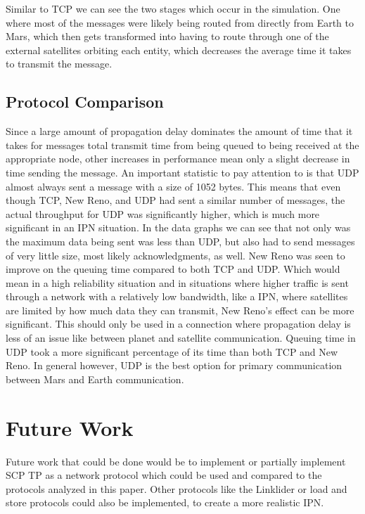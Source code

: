 \documentclass[a4paper,12pt]{article}
\begin{document}
Similar to TCP we can see the two stages which occur in the simulation. One
where most of the messages were likely being routed from directly from Earth to
Mars, which then gets transformed into having to route through one of the
external satellites orbiting each entity, which decreases the average time it
takes to transmit the message.

\subsection{Protocol Comparison}

Since a large amount of propagation delay dominates the amount of time that it
takes for messages total transmit time from being queued to being received at
the appropriate node, other increases in performance mean only a slight decrease
in time sending the message. An important statistic to pay attention to is that
UDP almost always sent a message with a size of 1052 bytes. This means that even
though TCP, New Reno, and UDP had sent a similar number of messages, the actual
throughput for UDP was significantly higher, which is much more significant in
an IPN situation. In the data graphs we can see that not only was the maximum
data being sent was less than UDP, but also had to send messages of very little
size, most likely acknowledgments, as well. New Reno was seen to improve on the
queuing time compared to both TCP and UDP. Which would mean in a high
reliability situation and in situations where higher traffic is sent through a
network with a relatively low bandwidth, like a IPN, where satellites are
limited by how much data they can transmit, New Reno's effect can be more
significant. This should only be used in a connection where propagation delay is
less of an issue like between planet and satellite communication. Queuing time
in UDP took a more significant percentage of its time than both TCP and New
Reno. In general however, UDP is the best option for primary communication
between Mars and Earth communication.

\section{Future Work}

Future work that could be done would be to implement or partially implement SCP
TP as a network protocol which could be used and compared to the protocols
analyzed in this paper. Other protocols like the Linklider or load and store
protocols could also be implemented, to create a more realistic IPN.
\end{document}
